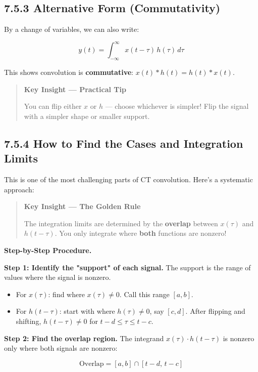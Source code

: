 \documentclass[11pt]{article}
\begin{document}
\subsection*{7.5.3 Alternative Form (Commutativity)}

By a change of variables, we can also write:

\[y(t) = \int_{-\infty}^{\infty} x(t - \tau)\,h(\tau)\,d\tau\]

This shows convolution is \textbf{commutative}: $x(t)*h(t) = h(t)*x(t)$.

\begin{quote}
\textbf{Key Insight — Practical Tip}

You can flip either $x$ or $h$ — choose whichever is simpler! Flip the signal with a simpler shape or smaller support.
\end{quote}

\subsection*{7.5.4 How to Find the Cases and Integration Limits}

This is one of the most challenging parts of CT convolution. Here's a systematic approach:

\begin{quote}
\textbf{Key Insight — The Golden Rule}

The integration limits are determined by the \textbf{overlap} between $x(\tau)$ and $h(t-\tau)$. You only integrate where \textbf{both} functions are nonzero!
\end{quote}

\textbf{Step-by-Step Procedure.}

\textbf{Step 1: Identify the "support" of each signal.} The support is the range of values where the signal is nonzero.

\begin{itemize}
  \item For $x(\tau)$: find where $x(\tau) \neq 0$. Call this range $[a,b]$.
  \item For $h(t-\tau)$: start with where $h(\tau) \neq 0$, say $[c,d]$. After flipping and shifting, $h(t-\tau) \neq 0$ for $t-d \leq \tau \leq t-c$.
\end{itemize}

\textbf{Step 2: Find the overlap region.} The integrand $x(\tau)\cdot h(t-\tau)$ is nonzero only where both signals are nonzero:

\[\text{Overlap} = [a,b]\cap[t-d,\,t-c]\]
\end{document}
